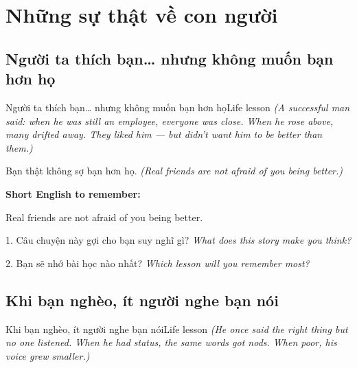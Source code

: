 \chapter{Những sự thật về con người}


\section{Người ta thích bạn… nhưng không muốn bạn hơn họ}
\begin{truyen}{Người ta thích bạn… nhưng không muốn bạn hơn họ}{Life lesson}
\textit{(A successful man said: when he was still an employee, everyone was close. When he rose above, many drifted away. They liked him — but didn't want him to be better than them.)}
\end{truyen}

\begin{baihoc}
Bạn thật không sợ bạn hơn họ.
\textit{(Real friends are not afraid of you being better.)}
\end{baihoc}

\begin{ghinhoanh}
\textbf{Short English to remember:}

Real friends are not afraid of you being better.

\end{ghinhoanh}

\begin{tuhocnhanh}
1. Câu chuyện này gợi cho bạn suy nghĩ gì? \textit{What does this story make you think?}

2. Bạn sẽ nhớ bài học nào nhất? \textit{Which lesson will you remember most?}
\end{tuhocnhanh}
\ngancach


\section{Khi bạn nghèo, ít người nghe bạn nói}
\begin{truyen}{Khi bạn nghèo, ít người nghe bạn nói}{Life lesson}
\textit{(He once said the right thing but no one listened. When he had status, the same words got nods. When poor, his voice grew smaller.)}
\end{truyen}

